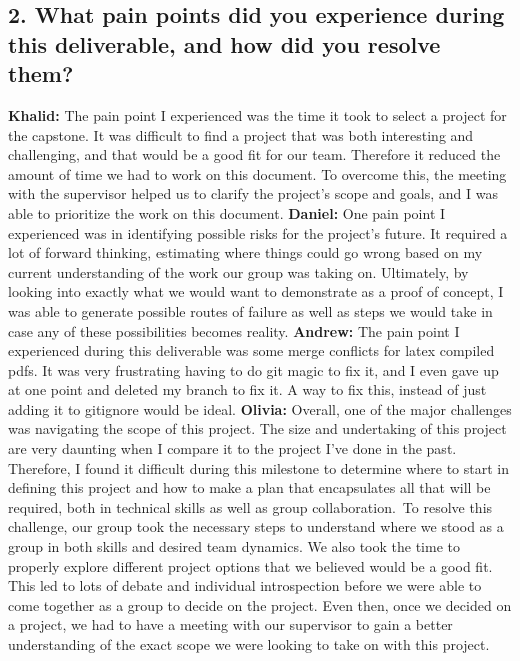 \documentclass{article}
\begin{document}
\subsection*{2. What pain points did you experience during this deliverable, and how did you resolve them?}
\bigskip
\textbf{Khalid:} The pain point I experienced was the time it took to select a project for the capstone. It was difficult to find a project that was both interesting and challenging, and that would be a good fit for our team. Therefore it reduced the amount of time we had to work on this document. To overcome this, the meeting with the supervisor helped us to clarify the project's scope and goals, and I was able to prioritize the work on this document.
\newline
\newline
\textbf{Daniel:} One pain point I experienced was in identifying possible risks for the project's future. It required a lot of forward thinking, estimating where things could go wrong based on my current understanding of the work our group was taking on. Ultimately, by looking into exactly what we would want to demonstrate as a proof of concept, I was able to generate possible routes of failure as well as steps we would take in case any of these possibilities becomes reality.
\newline
\newline
\textbf{Andrew:} The pain point I experienced during this deliverable was some merge conflicts for latex compiled pdfs. It was very frustrating having to do git magic to fix it, and I even gave up at one point and deleted my branch to fix it. A way to fix this, instead of just adding it to gitignore would be ideal. 
\newline
\newline
\textbf{Olivia:} Overall, one of the major challenges was navigating the scope of this project. The size and undertaking of this project are very daunting when I compare it to the project I’ve done in the past. Therefore, I found it difficult during this milestone to determine where to start in defining this project and how to make a plan that encapsulates all that will be required, both in technical skills as well as group collaboration. To resolve this challenge, our group took the necessary steps to understand where we stood as a group in both skills and desired team dynamics. We also took the time to properly explore different project options that we believed would be a good fit. This led to lots of debate and individual introspection before we were able to come together as a group to decide on the project. Even then, once we decided on a project, we had to have a meeting with our supervisor to gain a better understanding of the exact scope we were looking to take on with this project.
\end{document}
